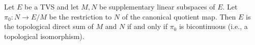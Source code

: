 Let $E$ be a TVS and let $M, N$ be supplementary linear subspaces of $E$. Let $\pi_0 \colon N \to E/M$ be the restriction to $N$ of the canonical quotient map. Then $E$ is the topological direct sum of $M$ and $N$ if and only if $\pi_0$ is bicontinuous (i.e., a topological isomorphism).
